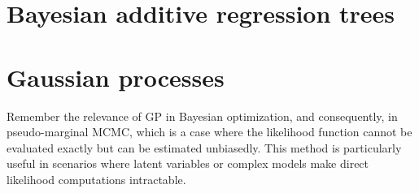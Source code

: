 \section{Bayesian additive regression trees}\label{sec13_3}

\section{Gaussian processes}\label{13_4}

Remember the relevance of GP in Bayesian optimization, and consequently, in pseudo-marginal MCMC, which is a case where the likelihood function cannot be evaluated exactly but can be estimated unbiasedly. This method is particularly useful in scenarios where latent variables or complex models make direct likelihood computations intractable.